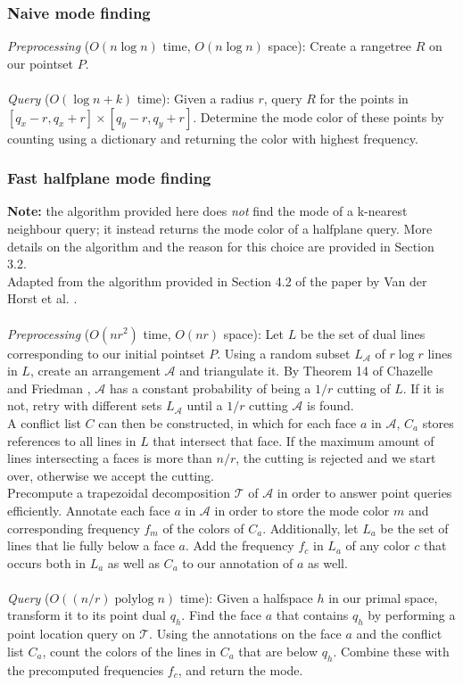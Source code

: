 \documentclass{article}
\newcommand{\fb}[1]{{#1}}
\newcommand{\fbnote}[1]{{}}
\DeclareMathOperator{\polylog}{polylog}
\begin{document}
\subsubsection{Naive mode finding}
\fb{
\textit{Preprocessing} ($O(n \log n)$ time, $O(n \log n)$ space): Create a rangetree $R$ on our pointset $P$. \\\\
\textit{Query} ($O(\log n + k)$ time): Given a radius $r$, query $R$ for the points in $[q_x - r, q_x + r] \times [q_y - r, q_y + r]$. Determine the mode color of these points by counting using a dictionary and returning the color with highest frequency. 
}
\subsubsection{Fast halfplane mode finding}
\textbf{Note: } the algorithm provided here does \textit{not} find the mode of a k-nearest neighbour query; it instead returns the mode color of a halfplane query. More details on the algorithm and the reason for this choice are provided in Section 3.2. \\
Adapted from the algorithm provided in Section 4.2 of the paper by Van der Horst et al. \cite{vanderhorst_et_al:LIPIcs.ESA.2022.67}. \\\\
\fbnote{For this section, all mention of face $f$ has been replaced with face $a$ in order to reduce confusion with frequencies $f_x$.}
\textit{Preprocessing} ($O(nr^2)$ time, $O(nr)$ space): Let $L$ be the set of dual lines corresponding to our initial pointset $P$. \fb{Using a random subset $L_{\mathcal{A}}$ of $r \log r$ lines in $L$, create an arrangement $\mathcal{A}$ and triangulate it. By Theorem 14 of Chazelle and Friedman \cite{21970}, $\mathcal{A}$ has a constant probability of being a $1/r$ cutting of $L$. If it is not, retry with different sets $L_{\mathcal{A}}$ until a $1/r$ cutting $\mathcal{A}$ is found.}\\ A conflict list $C$ can then be constructed, in which for each face $a$ in $\mathcal{A}$, $C_a$ stores references to all lines in $L$ that intersect that face. If the maximum amount of lines intersecting a faces is more than $n/r$, the cutting is rejected and we start over, otherwise we accept the cutting. \\
\fb{Precompute a trapezoidal decomposition $\mathcal{T}$ of $\mathcal{A}$ in order to answer point queries efficiently. Annotate each face $a$ in $\mathcal{A}$ in order to store the mode color $m$ and corresponding frequency $f_m$ of the colors of $C_a$. Additionally, let $L_a$ be the set of lines that lie fully below a face $a$. Add the frequency $f_c$ in $L_a$ of any color $c$ that occurs both in $L_a$ as well as $C_a$ to our annotation of $a$ as well.}\\\\
\textit{Query} ($O((n/r) \polylog n)$ time): Given a halfspace $h$ in our primal space, transform it to its point dual $q_h$. Find the face $a$ that contains $q_h$ by performing a point location query on $\mathcal{T}$. Using the annotations on the face $a$ and the conflict list $C_a$, count the colors of the lines in $C_a$ that are below $q_h$. Combine these with the precomputed frequencies $f_c$, and return the mode.
\end{document}
